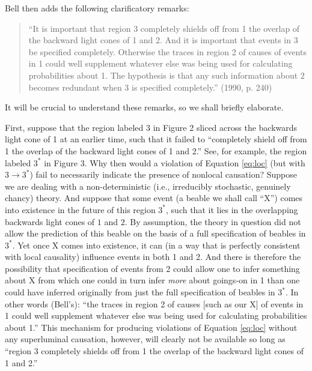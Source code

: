 \documentclass[aps,prc,twocolumn]{revtex4}
\begin{document}
Bell then adds the following clarificatory remarks:
\begin{quote}
``It is important that region 3 completely shields off from 1 the
overlap of the backward light cones of 1 and 2.  And it is important
that events in 3 be specified completely.  Otherwise the traces in
region 2 of causes of events in 1 could well supplement whatever else
was being used for calculating probabilities about 1.  The hypothesis
is that any such information about 2 becomes redundant when 3 is
specified completely.''  (1990, p. 240)
\end{quote}
It will be crucial to understand these remarks, so we shall briefly
elaborate.  

First, suppose that the region labeled $3$ in Figure 2
sliced across the backwards light cone of 1 at an earlier time, such
that it failed to ``completely shield off from 1 the overlap of the
backward light cones of 1 and 2.''  See, for example, the region 
labeled $3^*$ in Figure 3.  Why then would a violation of
Equation \ref{eq:loc} (but with $3 \rightarrow 3^*$) 
fail to necessarily indicate the presence of 
nonlocal causation?  Suppose we are dealing with a non-deterministic
(i.e., irreducibly stochastic, genuinely chancy) theory.  And suppose
that some event (a beable we shall call ``X'')  comes into existence
in the future of this
region $3^*$, such that it lies in the overlapping
backwards light cones of $1$ and $2$.  By assumption, the theory in
question did not allow the prediction of this beable on the basis of a
full specification of beables in $3^*$.  Yet once X comes into existence,
it can (in a way that is perfectly consistent with local causality)
influence events in both 1 and 2.  And there is therefore the
possibility that specification of events from 2 could allow one to infer
something about X from which one could in turn infer \emph{more}
about goings-on in 1 than one could have inferred originally from just
the full specification of beables in $3^*$.  In other words (Bell's): ``the
traces in region 2 of causes [such as our X] of events in 1
could well supplement whatever else was being used for calculating
probabilities about 1.''  This mechanism for producing violations of
Equation \ref{eq:loc} without any superluminal causation, however,   
will clearly not be available so long as ``region 3 completely shields
off from 1 the overlap of the backward light cones of 1 and 2.''   
\end{document}
